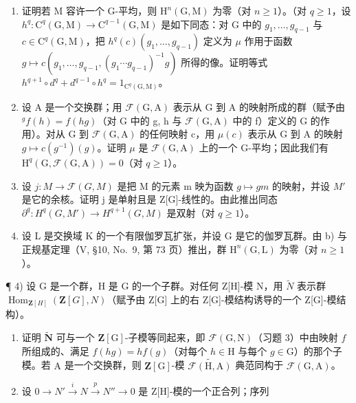 \begin{enumerate}
\def\labelenumi{\alph{enumi})}
\item
  证明若 M 容许一个 G-平均，则 \(\mathrm{H}^{n}(\mathrm{G},\mathrm{M})\) 为零（对 \(n \geqslant 1\)）。（对 \(q \geqslant 1\)，设 \(h^{q}: \mathrm{C}^{q}(\mathrm{G},\mathrm{M}) \to \mathrm{C}^{q-1}(\mathrm{G},\mathrm{M})\) 是如下同态：对 G 中的 \(g_{1}, \ldots, g_{q-1}\) 与 \(c \in \mathrm{C}^{q}(\mathrm{G}, \mathrm{M})\)，把 \(h^{q}(c)(g_{1}, \ldots, g_{q-1})\) 定义为 \(\mu\) 作用于函数 \(g \mapsto c(g_{1}, \ldots, g_{q-1}, (g_{1} \cdots g_{q-1})^{-1}g)\) 所得的像。证明等式 \(h^{q+1} \circ d^{q} + d^{q-1} \circ h^{q} = 1_{\mathrm{C}^{q}(\mathrm{G}, \mathrm{M})}\)。
\item
  设 A 是一个交换群；用 \(\mathcal{F}(\mathrm{G},\mathrm{A})\) 表示从 G 到 A 的映射所成的群（赋予由 \({}^{g}f(h)=f(hg)\)（对 G 中的 g, h 与 \(\mathcal{F}(\mathrm{G},\mathrm{A})\) 中的 f）定义的 G 的作用）。对从 G 到 \(\mathcal{F}(\mathrm{G},\mathrm{A})\) 的任何映射 c，用 \(\mu(c)\) 表示从 G 到 A 的映射 \(g\mapsto c(g^{-1})(g)\)。证明 \(\mu\) 是 \(\mathcal{F}(\mathrm{G},\mathrm{A})\) 上的一个 G-平均；因此我们有 \(\mathrm{H}^{q}(\mathrm{G},\mathcal{F}(\mathrm{G},\mathrm{A}))=0\)（对 \(q\geqslant1\)）。
\item
  设 \(j: M \to \mathcal{F}(G, M)\) 是把 M 的元素 m 映为函数 \(g \mapsto gm\) 的映射，并设 \(M'\) 是它的余核。证明 j 是单射且是 Z{[}G{]}-线性的。由此推出同态 \(\partial^{q}: H^{q}(G, M') \to H^{q+1}(G, M)\) 是双射（对 \(q \geqslant 1\)）。
\item
  设 L 是交换域 K 的一个有限伽罗瓦扩张，并设 G 是它的伽罗瓦群。由 b) 与正规基定理（V, §10, No.~9, 第 73 页）推出，群 \(\mathrm{H}^{n}(\mathrm{G},\mathrm{L})\) 为零（对 \(n \geqslant 1\)）。
\end{enumerate}

¶ 4) 设 G 是一个群，H 是 G 的一个子群。对任何 Z{[}H{]}-模 N，用 \(\widetilde{N}\) 表示群 \(\operatorname{Hom}_{\mathbf{Z}[H]}(\mathbf{Z}[G], N)\)（赋予由 Z{[}G{]} 上的右 Z{[}G{]}-模结构诱导的一个 Z{[}G{]}-模结构）。

\begin{enumerate}
\def\labelenumi{\alph{enumi})}
\item
  证明 \(\widetilde{\mathbf{N}}\) 可与一个 \(\mathbf{Z}[\mathrm{G}]\)-子模等同起来，即 \(\mathcal{F}(\mathrm{G},\mathrm{N})\)（习题 3）中由映射 \(f\) 所组成的、满足 \(f(hg) = hf(g)\)（对每个 \(h\in \mathrm{H}\) 与每个 \(g\in \mathrm{G}\)）的那个子模。若 \(\mathrm{A}\) 是一个交换群，则 \(\mathbf{Z}[\mathrm{G}]\)-模 \(\widetilde{\mathcal{F}(\mathrm{H},\mathrm{A})}\) 典范同构于 \(\mathcal{F}(\mathrm{G},\mathrm{A})\)。
\item
  设 \(0 \rightarrow N' \stackrel{i}{\rightarrow} N \stackrel{p}{\rightarrow} N'' \rightarrow 0\) 是 Z{[}H{]}-模的一个正合列；序列
\end{enumerate}

